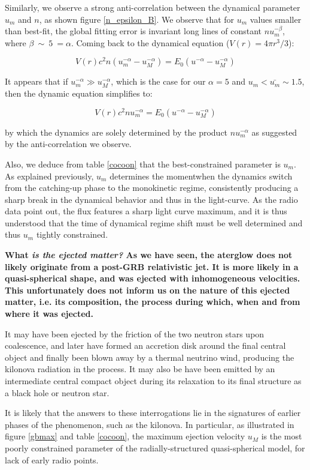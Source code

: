 Similarly, we observe a strong anti-correlation between the dynamical parameter $u_m$ and $n$, as shown figure \ref{n_epsilon_B}. We observe that for $u_m$ values smaller than best-fit, the global fitting error is invariant long lines of constant $nu_m^{-\beta}$, where $\beta~\sim~5~=\alpha$. Coming back to the dynamical equation ($V(r) = 4\pi r^3/3$):

$$V(r)c^2 n (u_m^{-\alpha} - u_M^{-\alpha}) = E_0 (u^{-\alpha} - u_M^{-\alpha}) $$

It appears that if $u_m^{-\alpha} \gg u_M^{-\alpha}$, which is the case for our $\alpha = 5$ and $u_m < \bar{u_m} \sim 1.5$, then the dynamic equation simplifies to:

$$V(r)c^2 n u_m^{-\alpha} = E_0 (u^{-\alpha} - u_M^{-\alpha}) $$

by which the dynamics are solely determined by the product $n u_m^{-\alpha}$ as suggested by the anti-correlation we observe.

Also, we deduce from table \ref{cocoon} that the best-constrained parameter is $u_m$. As explained previously, $u_m$ determines the momentwhen the dynamics switch from the catching-up phase to the monokinetic regime, consistently producing a sharp break in the dynamical behavior and thus in the light-curve. As the radio data point out, the flux features a sharp light curve maximum, and it is thus understood that the time of dynamical regime shift must be well determined and thus $u_m$ tightly constrained.

\bf{What \it{is} the ejected matter? }As we have seen, the aterglow does not likely originate from a post-GRB relativistic jet. It is more likely in a quasi-spherical shape, and was ejected with inhomogeneous velocities. This unfortunately does not inform us on the nature of this ejected matter, i.e. its composition, the process during which, when and from where it was ejected.

It may have been ejected by the friction of the two neutron stars upon coalescence, and later have formed an accretion disk around the final central object and finally been blown away by a thermal neutrino wind, producing the kilonova radiation in the process. It may also be have been emitted by an intermediate central compact object during its relaxation to its final structure as a black hole or neutron star.

It is likely that the answers to these interrogations lie in the signatures of earlier phases of the phenomenon, such as the kilonova. In particular, as illustrated in figure \ref{gbmax} and table \ref{cocoon}, the maximum ejection velocity $u_M$ is the most poorly constrained parameter of the radially-structured quasi-spherical model, for lack of early radio points.


